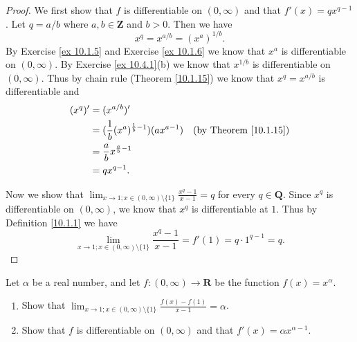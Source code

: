 \begin{proof}
    We first show that \(f\) is differentiable on \((0, \infty)\) and that \(f'(x) = q x^{q - 1}\).
    Let \(q = a / b\) where \(a, b \in \mathbf{Z}\) and \(b > 0\).
    Then we have
    \[
        x^q = x^{a / b} = (x^a)^{1 / b}.
    \]
    By Exercise \ref{ex 10.1.5} and Exercise \ref{ex 10.1.6} we know that \(x^a\) is differentiable on \((0, \infty)\).
    By Exercise \ref{ex 10.4.1}(b) we know that \(x^{1 / b}\) is differentiable on \((0, \infty)\).
    Thus by chain rule (Theorem \ref{10.1.15}) we know that \(x^q = x^{a / b}\) is differentiable and
    \begin{align*}
        (x^q)' & = (x^{a / b})'                                                                            \\
               & = (\frac{1}{b} (x^a)^{\frac{1}{b} - 1}) (a x^{a - 1}) & \text{(by Theorem \ref{10.1.15})} \\
               & = \frac{a}{b} x^{\frac{a}{b} - 1}                                                         \\
               & = q x^{q - 1}.
    \end{align*}

    Now we show that \(\lim_{x \to 1 ; x \in (0, \infty) \setminus \{1\}} \frac{x^q - 1}{x - 1} = q\) for every \(q \in \mathbf{Q}\).
    Since \(x^q\) is differentiable on \((0, \infty)\), we know that \(x^q\) is differentiable at \(1\).
    Thus by Definition \ref{10.1.1} we have
    \[
        \lim_{x \to 1 ; x \in (0, \infty) \setminus \{1\}} \frac{x^q - 1}{x - 1} = f'(1) = q \cdot 1^{q - 1} = q.
    \]
\end{proof}

\begin{exercise}\label{ex 10.4.3}
    Let \(\alpha\) be a real number, and let \(f : (0, \infty) \to \mathbf{R}\) be the function \(f(x) = x^{\alpha}\).
    \begin{enumerate}
        \item Show that \(\lim_{x \to 1 ; x \in (0, \infty) \setminus \{1\}} \frac{f(x) - f(1)}{x - 1} = \alpha\).
        \item Show that \(f\) is differentiable on \((0, \infty)\) and that \(f'(x) = \alpha x^{\alpha - 1}\).
    \end{enumerate}
\end{exercise}

